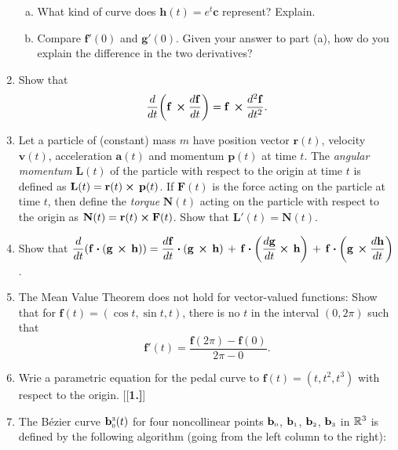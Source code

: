 \begin{enumerate}[\bfseries 1.]
\begin{enumerate}[(a)]
   \item What kind of curve does $\mathbf{h}(t) = e^t\mathbf{c}$ represent? Explain.
   \item Compare $\mathbf{f}'(0)$ and $\mathbf{g}'(0)$. 
   Given your answer to part (a), how do you explain the difference in the two derivatives?
  \end{enumerate}
 \item Show that 
 \[\dfrac{d}{dt} \biggl( \mathbf{f}\, \bm{\times} \dfrac{d\mathbf{f}}{dt} \biggr) =
  \mathbf{f}\, \bm{\times} \dfrac{d^2 \mathbf{f}}{dt^2}.\]
 \item Let a particle of (constant) mass $m$ have position vector $\mathbf{r}(t)$, velocity $\mathbf{v}(t)$,
  acceleration $\mathbf{a}(t)$ and momentum $\mathbf{p}(t)$ at time $t$. The \emph{angular momentum} $\mathbf{L}(t)$ of
  the particle with respect to the origin at time $t$ is defined as $\mathbf{L}(t) =
  \mathbf{r}(t) \bm{\times} \,\mathbf{p}(t)$. 
  If $\mathbf{F}(t)$ is the force acting on the particle at time $t$, then
  define the \emph{torque} $\mathbf{N}(t)$ acting on the particle with respect to the origin as
  $\mathbf{N}(t) = \mathbf{r}(t) \bm{\times} \mathbf{F}(t)$. Show that $\mathbf{L}'(t) = \mathbf{N}(t)$.
 \item Show that $\dfrac{d}{dt} ( \mathbf{f} \bm{\cdot} ( \mathbf{g}\, \bm{\times} \,\mathbf{h} ) ) =
  \dfrac{d\mathbf{f}}{dt} \bm{\cdot} (\mathbf{g}\, \bm{\times} \,\mathbf{h}) \,+\,
  \mathbf{f} \bm{\cdot} \biggl(\dfrac{d \mathbf{g}}{dt} \bm{\times} \,\mathbf{h}\biggr) \,+\,
  \mathbf{f} \bm{\cdot} \biggl(\mathbf{g}\, \bm{\times} \dfrac{d \mathbf{h}}{dt}\biggr)$.
 \item The Mean Value Theorem does not hold for vector-valued functions:
 Show that for $\mathbf{f}(t) = (\cos t, \sin t,t)$, there is no $t$ in the interval $(0,2\pi)$ such that
 \begin{displaymath}
  \mathbf{f}'(t) = \dfrac{\mathbf{f}(2\pi) - \mathbf{f}(0)}{2\pi - 0} .
 \end{displaymath}
 \item Wrie a parametric equation for the pedal curve to $\mathbf{f}(t)=(t,t^2,t^3)$ with respect to the origin.
[{[\bfseries 1.]}]
 \item The B\'{e}zier curve $\mathbf{b}_{\scriptscriptstyle 0}^{\scriptscriptstyle 3}(t)$ for four noncollinear points
  $\mathbf{b}_{\scriptscriptstyle 0}$, $\mathbf{b}_{\scriptscriptstyle 1}$, $\mathbf{b}_{\scriptscriptstyle 2}$, $\mathbf{b}_{\scriptscriptstyle 3}$ in $\mathbb{R}^{3}$ is
  defined by the following algorithm (going from the left column to the right):

\end{enumerate}

